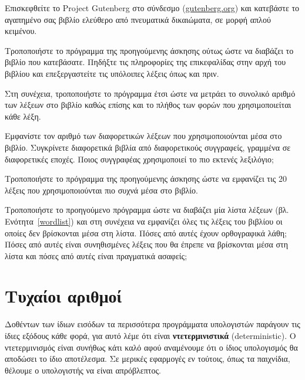 \documentclass[10pt]{book}
\begin{document}
 
\begin{exercise}

Επισκεφθείτε το Project Gutenberg στο σύνδεσμο (\url{gutenberg.org}) και κατεβάστε το αγαπημένο σας βιβλίο ελεύθερο από πνευματικά δικαιώματα, σε μορφή απλού κειμένου.

Τροποποιήστε το πρόγραμμα της προηγούμενης άσκησης ούτως ώστε να διαβάζει το βιβλίο που κατεβάσατε. Πηδήξτε τις πληροφορίες της επικεφαλίδας στην αρχή του βιβλίου και επεξεργαστείτε τις υπόλοιπες λέξεις όπως και πριν.

Στη συνέχεια, τροποποιήστε το πρόγραμμα έτσι ώστε να μετράει το συνολικό αριθμό των λέξεων στο βιβλίο καθώς επίσης και το πλήθος των φορών που χρησιμοποιείται κάθε λέξη.

Εμφανίστε τον αριθμό των διαφορετικών λέξεων που χρησιμοποιούνται μέσα στο βιβλίο. Συγκρίνετε διαφορετικά βιβλία από διαφορετικούς συγγραφείς, γραμμένα σε διαφορετικές εποχές. Ποιος συγγραφέας χρησιμοποιεί το πιο εκτενές λεξιλόγιο;
\\
\end{exercise}


\begin{exercise}

Τροποποιήστε το πρόγραμμα της προηγούμενης άσκησης ώστε να εμφανίζει τις 20 λέξεις που χρησιμοποιούνται πιο συχνά μέσα στο βιβλίο.
\\
\end{exercise}

\begin{exercise}

Τροποποιήστε το προηγούμενο πρόγραμμα ώστε να διαβάζει μία λίστα λέξεων (βλ. Ενότητα~\ref{wordlist}) και στη συνέχεια να εμφανίζει όλες τις λέξεις του βιβλίου οι οποίες δεν βρίσκονται μέσα στη λίστα. Πόσες από αυτές έχουν ορθογραφικά λάθη; Πόσες από αυτές είναι συνηθισμένες λέξεις που θα έπρεπε να βρίσκονται μέσα στη λίστα και πόσες από αυτές είναι πραγματικά ασαφείς;
\end{exercise}

 
\section{Τυχαίοι αριθμοί}

Δοθέντων των ίδιων εισόδων τα περισσότερα προγράμματα υπολογιστών παράγουν τις ίδιες εξόδους κάθε φορά, για  αυτό λέμε ότι είναι {\bf ντετερμινιστικά} (deterministic). Ο ντετερμινισμός είναι συνήθως κάτι καλό αφού αναμένουμε ότι ο ίδιος υπολογισμός θα αποδώσει το ίδιο αποτέλεσμα. Σε μερικές εφαρμογές εν τούτοις, όπως τα παιχνίδια, θέλουμε ο υπολογιστής να είναι απρόβλεπτος. 
\end{document}
